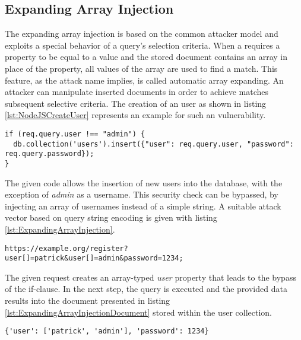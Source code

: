 \subsection{Expanding Array Injection}
The expanding array injection is based on the common attacker model and exploits a special behavior of a query's selection criteria. When a requires a property to be equal to a value and the stored document contains an array in place of the property, all values of the array are used to find a match. This feature, as the attack name implies, is called automatic array expanding. An attacker can manipulate inserted documents in order to achieve matches subsequent selective criteria. The creation of an user as shown in listing \ref{lst:NodeJSCreateUser} represents an example for such an vulnerability. \\

\begin{lstlisting}[caption={Example for vulnerable MongoDB - NodeJS application}, label={lst:NodeJSCreateUser}]
if (req.query.user !== "admin") {
  db.collection('users').insert({"user": req.query.user, "password": req.query.password});
}
\end{lstlisting}

The given code allows the insertion of new users into the database, with the exception of \emph{admin} as a username. This security check can be bypassed, by injecting an array of usernames instead of a simple string. A suitable attack vector based on query string encoding is given with listing \ref{lst:ExpandingArrayInjection}.\\

\begin{lstlisting}[caption={MongoDB injection with NodeJS's query string module}, label={lst:ExpandingArrayInjection}]
https://example.org/register?user[]=patrick&user[]=admin&password=1234;
\end{lstlisting}

The given request creates an array-typed \emph{user} property that leads to the bypass of the if-clause. In the next step, the query is executed and the provided data results into the document presented in listing \ref{lst:ExpandingArrayInjectionDocument} stored within the user collection.\\

\begin{lstlisting}[caption={Injected query parameter for MongoDB - NodeJS injection}, label={lst:ExpandingArrayInjectionDocument}]
{'user': ['patrick', 'admin'], 'password': 1234}
\end{lstlisting}

